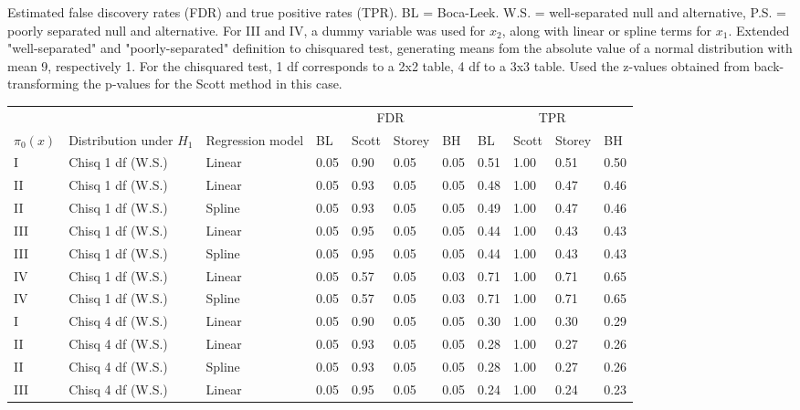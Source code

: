 \documentclass{article}\usepackage[]{graphicx}\usepackage[]{color}
\begin{document}
\clearpage

  Estimated false discovery rates (FDR) and true positive rates (TPR). BL = Boca-Leek. W.S. = well-separated null and alternative, P.S. = poorly separated null and alternative. For III and IV, a dummy variable was used for $x_{2}$, along with linear or spline terms for $x_1$. Extended "well-separated" and "poorly-separated" definition to chisquared test, generating means fom the absolute value of a normal distribution with mean 9, respectively 1. For the chisquared test, 1 df corresponds to a 2x2 table, 4 df to a 3x3 table. Used the z-values obtained from back-transforming the p-values for the Scott method in this case.
\begin{table}[ht]
\centering
\begin{tabular}{lll|llll|llll}
  \hline
  &&& \multicolumn{4}{c}{FDR} & \multicolumn{4}{c}{TPR}\\
 $\pi_0(x)$ &  Distribution under $H_1$ & Regression model & BL & Scott & Storey & BH & BL & Scott & Storey & BH    \\
 \hline
I & Chisq 1 df (W.S.) & Linear & 0.05 & 0.90 & 0.05 & 0.05 & 0.51 & 1.00 & 0.51 & 0.50 \\ 
  II & Chisq 1 df (W.S.) & Linear & 0.05 & 0.93 & 0.05 & 0.05 & 0.48 & 1.00 & 0.47 & 0.46 \\ 
  II & Chisq 1 df (W.S.) & Spline & 0.05 & 0.93 & 0.05 & 0.05 & 0.49 & 1.00 & 0.47 & 0.46 \\ 
  III & Chisq 1 df (W.S.) & Linear & 0.05 & 0.95 & 0.05 & 0.05 & 0.44 & 1.00 & 0.43 & 0.43 \\ 
  III & Chisq 1 df (W.S.) & Spline & 0.05 & 0.95 & 0.05 & 0.05 & 0.44 & 1.00 & 0.43 & 0.43 \\ 
  IV & Chisq 1 df (W.S.) & Linear & 0.05 & 0.57 & 0.05 & 0.03 & 0.71 & 1.00 & 0.71 & 0.65 \\ 
  IV & Chisq 1 df (W.S.) & Spline & 0.05 & 0.57 & 0.05 & 0.03 & 0.71 & 1.00 & 0.71 & 0.65 \\ 
   \hline
I & Chisq 4 df (W.S.) & Linear & 0.05 & 0.90 & 0.05 & 0.05 & 0.30 & 1.00 & 0.30 & 0.29 \\ 
  II & Chisq 4 df (W.S.) & Linear & 0.05 & 0.93 & 0.05 & 0.05 & 0.28 & 1.00 & 0.27 & 0.26 \\ 
  II & Chisq 4 df (W.S.) & Spline & 0.05 & 0.93 & 0.05 & 0.05 & 0.28 & 1.00 & 0.27 & 0.26 \\ 
  III & Chisq 4 df (W.S.) & Linear & 0.05 & 0.95 & 0.05 & 0.05 & 0.24 & 1.00 & 0.24 & 0.23 \\ 

\end{tabular}
\end{table}
\end{document}
